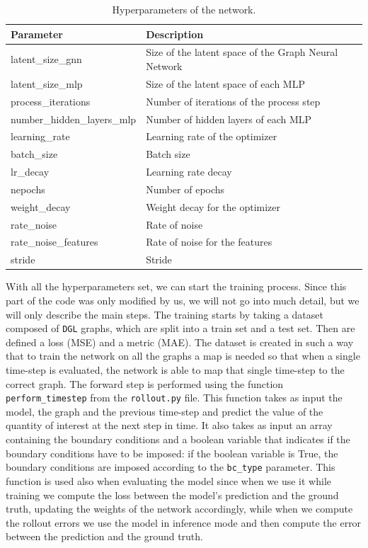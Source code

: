 \documentclass[11pt,a4paper]{article}
\begin{document}
\begin{table}[H]
\centering
\begin{tabular}{|l|l|}
\hline
\textbf{Parameter} & \textbf{Description} \\
\hline
latent\_size\_gnn & Size of the latent space of the Graph Neural Network \\
latent\_size\_mlp & Size of the latent space of each MLP \\
process\_iterations & Number of iterations of the process step \\
number\_hidden\_layers\_mlp & Number of hidden layers of each MLP \\
learning\_rate & Learning rate of the optimizer \\
batch\_size & Batch size \\
lr\_decay & Learning rate decay \\
nepochs & Number of epochs \\
weight\_decay & Weight decay for the optimizer \\
rate\_noise & Rate of noise \\
rate\_noise\_features & Rate of noise for the features \\
stride & Stride \\
\hline
\end{tabular}
\caption{Hyperparameters of the network.}
\label{hyperparams_description}
\end{table}

With all the hyperparameters set, we can start the training process. Since this part of the code was only modified by us, we will not go into much detail, but we will only describe the main steps. The training starts by taking a dataset composed of \texttt{DGL} graphs, which are split into a train set and a test set. Then are defined a loss (MSE) and a metric (MAE). The dataset is created in such a way that to train the network on all the graphs a map is needed so that when a single time-step is evaluated, the network is able to map that single time-step to the correct graph. The forward step is performed using the function \texttt{perform\_timestep} from the \texttt{rollout.py} file. This function takes as input the model, the graph and the previous time-step and predict the value of the quantity of interest at the next step in time. It also takes as input an array containing the boundary conditions and a boolean variable that indicates if the boundary conditions have to be imposed: if the boolean variable is True, the boundary conditions are imposed according to the \texttt{bc\_type} parameter.
This function is used also when evaluating the model since when we use it while training we compute the loss between the model's prediction and the ground truth, updating the weights of the network accordingly, while when we compute the rollout errors we use the model in inference mode and then compute the error between the prediction and the ground truth.
\end{document}
